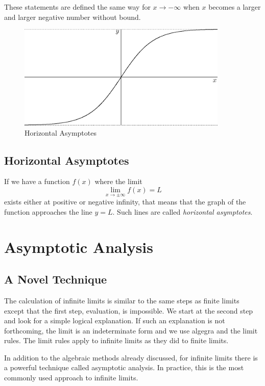 \documentclass[fleqn]{report}
\begin{document}
These statements are defined the same way for $x \rightarrow
-\infty$ when $x$ becomes a larger and larger negative number
without bound.

\begin{figure}[ht]
\centering
\includegraphics[width=10cm]{figure20.eps}
\caption{Horizontal Asymptotes}
\label{figure-horizontal-Asymptotes}
\end{figure}

\subsection{Horizontal Asymptotes}
\label{horizontal-asymptotes}

If we have a function $f(x)$ where the limit 
\begin{equation*}
\lim_{x \rightarrow \pm \infty} f(x) = L
\end{equation*}
exists either at positive or negative infinity, that means
that the graph of the function approaches the line $y=L$.
Such lines are called \emph{horizontal asymptotes}.

\section{Asymptotic Analysis}
\label{asymptotic analysis}

\subsection{A Novel Technique}
\label{novel-technique}

The calculation of infinite limits is similar to the same
steps as finite limits except that the first step, evaluation,
is impossible. We start at the second step and look for a
simple logical explanation. If such an explanation is not
forthcoming, the limit is an indeterminate form and we use
algegra and the limit rules. The limit rules apply to infinite
limits as they did to finite limits.

In addition to the algebraic methods already discussed, for
infinite limits there is a powerful technique called
asymptotic analysis. In practice, this is the most commonly
used approach to infinite limits.
\end{document}
